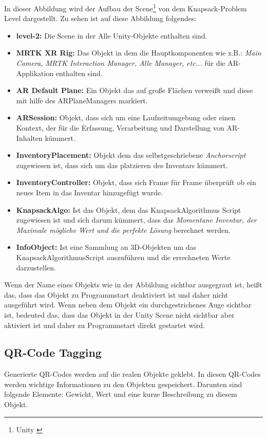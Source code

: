 In dieser Abbildung wird der Aufbau der Scene\footnote{Unity \cite{Scene}} von dem Knapsack-Problem Level dargestellt.
Zu sehen ist auf diese Abbildung folgendes:
\begin{itemize}
    \item \textbf{level-2:} Die Scene in der Alle Unity-Objekte enthalten sind.
    \item \textbf{MRTK XR Rig:} Das Objekt in dem die Hauptkomponenten wie z.B.: \textit{Main Camera, MRTK Interaction Manager, Alle Manager, etc... } für die AR-Applikation enthalten sind.
    \item \textbf{AR Default Plane:} Ein Objekt das auf große Flächen verweißt und diese mit hilfe des ARPlaneManagers markiert.
    \item \textbf{ARSession:} Objekt, dass sich um eine Laufzeitumgebung oder einen Kontext, der für die Erfassung, Verarbeitung und Darstellung von AR-Inhalten kümmert.
    \item \textbf{InventoryPlacement:} Objekt dem das selbstgeschriebene \textit{Anchorscript} zugewiesen ist, dass sich um das platzieren des Inventars kümmert.
    \item \textbf{InventoryController:} Objekt, dass sich Frame für Frame überprüft ob ein neues Item in das Inventar hinzugefügt wurde.
    \item \textbf{KnapsackAlgo:} Ist das Objekt, dem das KnapsackAlgorithmus Script zugewiesen ist und sich darum kümmert, dass das \textit{Momentane Inventar, der Maximale mögliche Wert und die perfekte Lösung} berechnet werden.
    \item \textbf{InfoObject:} Ist eine Sammlung an 3D-Objekten um das KnapsackAlgorithmusScript auszuführen und die errechneten Werte darzustellen.\\
\end{itemize}

Wenn der Name eines Objekts wie in der Abbildung sichtbar ausgegraut ist, heißt das, dass das Objekt zu Programmstart deaktiviert ist und daher nicht ausgeführt wird.
Wenn neben dem Objekt ein durchgestrichenes Auge sichtbar ist, bedeuted das, dass das Objekt in der Unity Scene nicht sichtbar aber aktiviert ist und daher zu Programmstart direkt gestartet wird.

\subsection{QR-Code Tagging}
Generierte QR-Codes werden auf die realen Objekte geklebt. In diesen QR-Codes werden
wichtige Informationen zu den Objekten gespeichert. Darunten sind folgende Elemente:
Gewicht, Wert und eine kurze Beschreibung zu diesem Objekt.

